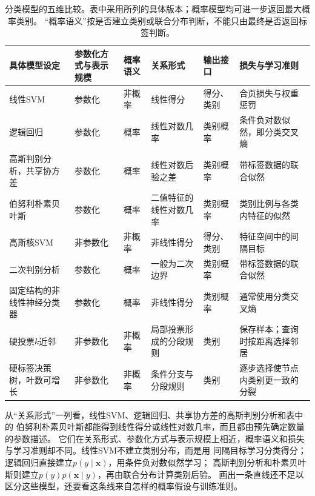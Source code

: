 \begin{table}[htbp]
  \centering
  \footnotesize
  \setlength{\tabcolsep}{4pt}
  \renewcommand{\arraystretch}{1.25}
  \begin{tabularx}{\linewidth}{@{}>{\raggedright\arraybackslash}p{28mm}>{\raggedright\arraybackslash}p{16mm}>{\raggedright\arraybackslash}p{11mm}>{\raggedright\arraybackslash}p{23mm}>{\raggedright\arraybackslash}p{22mm}>{\raggedright\arraybackslash}X@{}}
    \toprule
    \textbf{具体模型设定} & \textbf{参数化方式与表示规模} & \textbf{概率语义} & \textbf{关系形式} & \textbf{输出接口} & \textbf{损失与学习准则} \\
    \midrule
    线性SVM & 参数化 & 非概率 & 线性得分 & 得分、类别 & 合页损失与权重惩罚 \\
    逻辑回归 & 参数化 & 概率 & 线性对数几率 & 类别概率 & 条件负对数似然，即分类交叉熵 \\
    高斯判别分析，共享协方差 & 参数化 & 概率 & 线性对数后验之差 & 类别概率 & 带标签数据的联合似然 \\
    伯努利朴素贝叶斯 & 参数化 & 概率 & 二值特征的线性对数几率 & 类别概率 & 类别比例与各类内特征的似然 \\
    高斯核SVM & 非参数化 & 非概率 & 非线性得分 & 得分、类别 & 特征空间中的间隔目标 \\
    二次判别分析 & 参数化 & 概率 & 一般为二次边界 & 类别概率 & 带标签数据的联合似然 \\
    固定结构的非线性神经分类器 & 参数化 & 概率 & 非线性得分 & 类别概率 & 通常使用分类交叉熵 \\
    硬投票$k$近邻 & 非参数化 & 非概率 & 局部投票形成的分段规则 & 类别 & 保存样本；查询时按距离选择邻居 \\
    硬标签决策树，叶数可增长 & 非参数化 & 非概率 & 条件分支与分段规则 & 类别 & 逐步选择使节点内类别更一致的分裂 \\
    \bottomrule
  \end{tabularx}
  \caption{分类模型的五维比较。表中采用所列的具体版本；概率模型均可进一步返回最大概率类别。
  “概率语义”按是否建立类别或联合分布判断，不能只由最终是否返回标签判断。}
  \label{tab:models-classifiers}
\end{table}
\FloatBarrier

从“关系形式”一列看，线性SVM、逻辑回归、共享协方差的高斯判别分析和表中的
伯努利朴素贝叶斯都能得到线性得分或线性对数几率，而且都由预先确定数量的参数描述。
它们在关系形式、参数化方式与表示规模上相近，概率语义和损失与学习准则却不同。线性SVM不建立类别分布，而是用
间隔目标学习分类得分；逻辑回归直接建立$p(y\mid\bm{x})$，用条件负对数似然学习；
高斯判别分析和朴素贝叶斯则建立$p(y)p(\bm{x}\mid y)$，再由联合分布计算类别后验。
画出一条直线还不足以区分这些模型，还要看这条线来自怎样的概率假设与训练准则。

